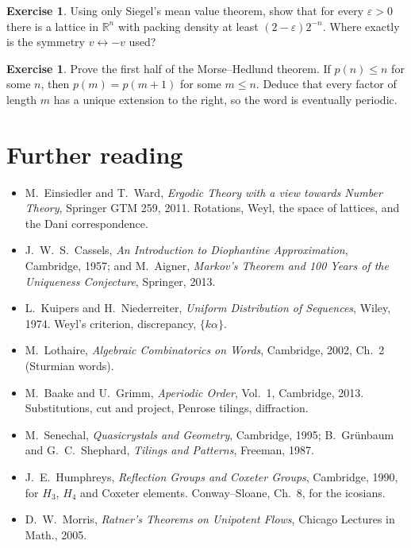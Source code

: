 \documentclass[11pt,openany]{book}
\theoremstyle{plain}
\theoremstyle{definition}
\newtheorem{exercise}[theorem]{Exercise}
\theoremstyle{remark}
\newcommand{\R}{\mathbb{R}}
\begin{document}
\begin{exercise}
Using only Siegel's mean value theorem, show that for every $\varepsilon>0$ there is a lattice in $\R^n$
with packing density at least $(2-\varepsilon)2^{-n}$. Where exactly is the symmetry $v\leftrightarrow-v$
used?
\end{exercise}

\begin{exercise}\label{ERG:ex:mh}
Prove the first half of the Morse--Hedlund theorem. If $p(n)\le n$ for some $n$, then $p(m)=p(m+1)$ for
some $m\le n$. Deduce that every factor of length $m$ has a unique extension to the right, so the word is
eventually periodic.
\end{exercise}

\section*{Further reading}
\begin{itemize}[nosep]
\item M.~Einsiedler and T.~Ward, \emph{Ergodic Theory with a view towards Number Theory}, Springer GTM 259,
  2011. Rotations, Weyl, the space of lattices, and the Dani correspondence.
\item J.~W.~S.~Cassels, \emph{An Introduction to Diophantine Approximation}, Cambridge, 1957; and
  M.~Aigner, \emph{Markov's Theorem and 100 Years of the Uniqueness Conjecture}, Springer, 2013.
\item L.~Kuipers and H.~Niederreiter, \emph{Uniform Distribution of Sequences}, Wiley, 1974. Weyl's
  criterion, discrepancy, $\{k\alpha\}$.
\item M.~Lothaire, \emph{Algebraic Combinatorics on Words}, Cambridge, 2002, Ch.~2 (Sturmian words).
\item M.~Baake and U.~Grimm, \emph{Aperiodic Order}, Vol.~1, Cambridge, 2013. Substitutions, cut and
  project, Penrose tilings, diffraction.
\item M.~Senechal, \emph{Quasicrystals and Geometry}, Cambridge, 1995; B.~Gr\"unbaum and G.~C.~Shephard,
  \emph{Tilings and Patterns}, Freeman, 1987.
\item J.~E.~Humphreys, \emph{Reflection Groups and Coxeter Groups}, Cambridge, 1990, for $H_3$, $H_4$ and
  Coxeter elements. Conway--Sloane, Ch.~8, for the icosians.
\item D.~W.~Morris, \emph{Ratner's Theorems on Unipotent Flows}, Chicago Lectures in Math., 2005.
\end{itemize}
\endgroup
\setcounter{chapter}{6}
\end{document}
